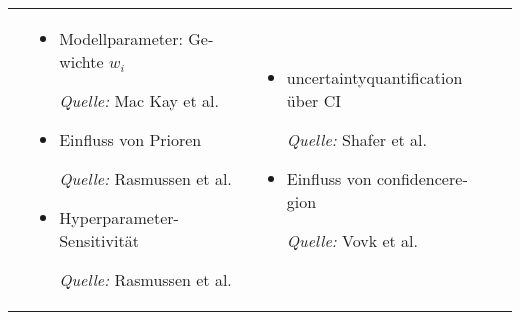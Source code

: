 \begin{otherlanguage}{ngerman}
\begin{table}[!htpb]
\begin{tabularx}{\textwidth}{|>{\centering\arraybackslash}l|X|X|X|}
    \multirow{7}{*}{\textbf{B}} & 
    \begin{minipage}[t]{\linewidth}
    \vspace{0.3em}
    \begin{itemize}[leftmargin=*, label={}, itemsep=0.125em, topsep=0em, parsep=0em]
        \item Modellparameter: Gewichte \( w_i \) \par
        \begin{scriptsize}\textit{Quelle:} Mac Kay et al. \parencite*[S.~448–450]{mackay1992practical}\end{scriptsize}
        \item Einfluss von Prioren \par
        \begin{scriptsize}\textit{Quelle:} Rasmussen et al. \parencite*[Kap.~5]{rasmussen2006gaussian}\end{scriptsize}
        \item Hyperparameter-Sensitivität \par
        \begin{scriptsize}\textit{Quelle:} Rasmussen et al. \parencite*[Kap.~5]{rasmussen2006gaussian}\end{scriptsize}
    \end{itemize}
    \vspace{0.3em}
    \end{minipage} &

    \begin{minipage}[t]{\linewidth}
    \vspace{0.3em}
    \begin{itemize}[leftmargin=*, label={}, itemsep=0.125em, topsep=0em, parsep=0em]
        \item \gls{uncertaintyquantification} über CI \par
        \begin{scriptsize}\textit{Quelle:} Shafer et al. \parencite*[S.~63–65]{shafer2008tutorial}\end{scriptsize}
        \item Einfluss von \gls{confidenceregion} \par
        \begin{scriptsize}\textit{Quelle:} Vovk et al. \parencite*{vovk2005algorithmic}\end{scriptsize}
    \end{itemize}
    \vspace{0.3em}
    \end{minipage} &


\end{tabularx}
\end{table}
\end{otherlanguage}
